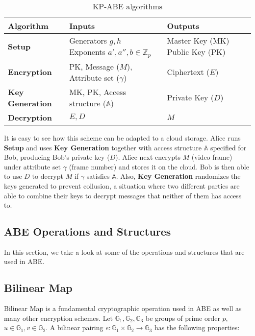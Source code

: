 \documentclass[hyp,a4paper,12pt,openbib]{socreport}
\begin{document}
\begin{table}[H]
\begin{tabular}{|l|p{}|p{}|}
    \hline
    \textbf{Algorithm} & \textbf{Inputs}                                           & \textbf{Outputs}                 \\ \hline
    \textbf{Setup}              & Generators $g,h$ \newline Exponents $a', a'', b \in \mathbb{Z}_p$ & Master Key (MK) \newline Public Key (PK) \\ \hline
    \textbf{Encryption}         & PK, Message ($M$), Attribute set ($\gamma$)               & Ciphertext ($E$)                 \\ \hline
    \textbf{Key Generation}     & MK, PK, Access structure ($\mathbb{A}$)                   & Private Key ($D$)                \\ \hline
    \textbf{Decryption}         & $E,D$                                                     & $M$                              \\ \hline
    \end{tabular}
    \caption {KP-ABE algorithms}
\label{tab:kpabe-algo}
\end{table}




It is easy to see how this scheme can be adapted to a cloud storage. Alice runs \textbf{Setup} and uses \textbf{Key Generation} together with access structure $\mathbb{A}$ specified for Bob, producing Bob's private key ($D$). Alice next encrypts $M$ (video frame) under attribute set $\gamma$ (frame number) and stores it on the cloud. Bob is then able to use $D$ to decrypt $M$ if $\gamma$ satisfies $\mathbb{A}$. Also, \textbf{Key Generation} randomizes the keys generated to prevent collusion, a situation where two different parties are able to combine their keys to decrypt messages that neither of them has access to. 


\subsection{ABE Operations and Structures}

In this section, we take a look at some of the operations and structures that are used in ABE.

 \subsection{Bilinear Map}
 \label{sec:bilinear}
Bilinear Map is a fundamental cryptographic operation used in ABE as well as many other encryption schemes. Let $\mathbb{G}_1, \mathbb{G}_2, \mathbb{G}_3$ be groups of prime order $p$, $u \in \mathbb{G}_1, v \in \mathbb{G}_2$.
A bilinear pairing $e:\mathbb{G}_1 \times \mathbb{G}_2 \to \mathbb{G}_3$  has the following properties:
\end{document}

